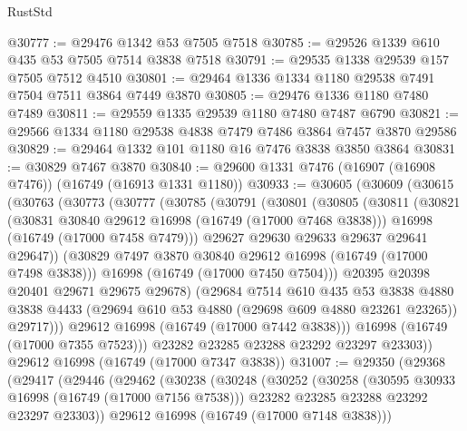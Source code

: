 \begin{lexlean}{RustStd}
\begin{coremodule}
@30777 := @29476 @1342 @53 @7505 @7518
@30785 := @29526 @1339 @610 @435 @53 @7505 @7514 @3838 @7518
@30791 := @29535 @1338 @29539 @157 @7505 @7512 @4510
@30801 := @29464 @1336 @1334 @1180 @29538 @7491 @7504 @7511 @3864 @7449 @3870
@30805 := @29476 @1336 @1180 @7480 @7489
@30811 := @29559 @1335 @29539 @1180 @7480 @7487 @6790
@30821 := @29566 @1334 @1180 @29538 @4838 @7479 @7486 @3864 @7457 @3870 @29586
@30829 := @29464 @1332 @101 @1180 @16 @7476 @3838 @3850 @3864
@30831 := @30829 @7467 @3870
@30840 := @29600 @1331 @7476 (@16907 (@16908 @7476)) (@16749 (@16913 @1331 @1180))
@30933 := @30605
    (@30609
      (@30615
        (@30763
          (@30773
            (@30777
              (@30785
                (@30791
                  (@30801
                    (@30805
                      (@30811
                        (@30821
                          (@30831 @30840 @29612 @16998 (@16749 (@17000 @7468 @3838)))
                          @16998
                          (@16749 (@17000 @7458 @7479)))
                        @29627
                        @29630
                        @29633
                        @29637
                        @29641
                        @29647))
                    (@30829 @7497 @3870 @30840 @29612 @16998 (@16749 (@17000 @7498 @3838)))
                    @16998
                    (@16749 (@17000 @7450 @7504)))
                  @20395
                  @20398
                  @20401
                  @29671
                  @29675
                  @29678)
                (@29684
                  @7514
                  @610
                  @435
                  @53
                  @3838
                  @4880
                  @3838
                  @4433
                  (@29694 @610 @53 @4880 (@29698 @609 @4880 @23261 @23265))
                  @29717)))
            @29612
            @16998
            (@16749 (@17000 @7442 @3838)))
          @16998
          (@16749 (@17000 @7355 @7523)))
        @23282
        @23285
        @23288
        @23292
        @23297
        @23303))
    @29612
    @16998
    (@16749 (@17000 @7347 @3838))
@31007 := @29350
    (@29368
      (@29417
        (@29446
          (@29462
            (@30238
              (@30248
                (@30252
                  (@30258
                    (@30595 @30933 @16998 (@16749 (@17000 @7156 @7538)))
                    @23282
                    @23285
                    @23288
                    @23292
                    @23297
                    @23303))
                @29612
                @16998
                (@16749 (@17000 @7148 @3838)))

\end{coremodule}
\end{lexlean}
